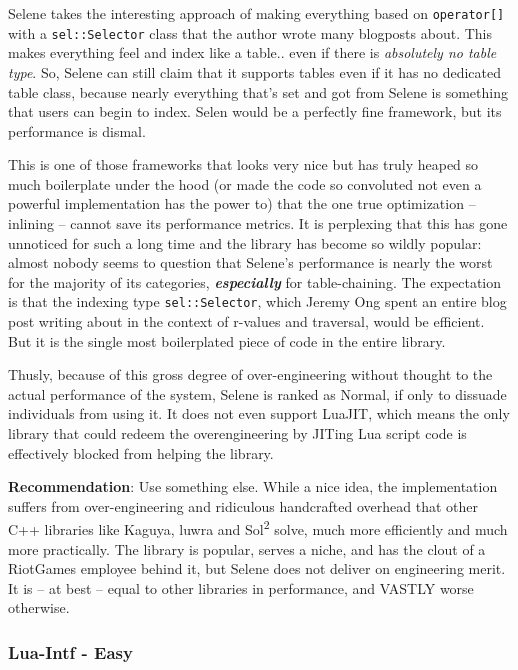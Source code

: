 \documentclass[conference,compsoc]{IEEEtran}
\newcommand{\soltwo}{Sol\textsuperscript{2}}
\begin{document}
Selene takes the interesting approach of making everything based on \lstinline|operator[]| with a \lstinline|sel::Selector| class that the author wrote many blogposts about. This makes everything feel and index like a table.. even if there is \emph{absolutely no table type}. So, Selene can still claim that it supports tables even if it has no dedicated table class, because nearly everything that's set and got from Selene is something that users can begin to index. Selen would be a perfectly fine framework, but its performance is dismal.

This is one of those frameworks that looks very nice but has truly heaped so much boilerplate under the hood (or made the code so convoluted not even a powerful implementation has the power to) that the one true optimization -- inlining -- cannot save its performance metrics. It is perplexing that this has gone unnoticed for such a long time and the library has become so wildly popular: almost nobody seems to question that Selene's performance is nearly the worst for the majority of its categories, \emph{\textbf{especially}} for table-chaining. The expectation is that the indexing type \lstinline|sel::Selector|, which Jeremy Ong spent an entire blog post writing about in the context of r-values and traversal, would be efficient. But it is the single most boilerplated piece of code in the entire library.

Thusly, because of this gross degree of over-engineering without thought to the actual performance of the system, Selene is ranked as Normal, if only to dissuade individuals from using it. It does not even support LuaJIT, which means the only library that could redeem the overengineering by JITing Lua script code is effectively blocked from helping the library.

\textbf{Recommendation}: Use something else. While a nice idea, the implementation suffers from over-engineering and ridiculous handcrafted overhead that other C++ libraries like Kaguya, luwra and \soltwo{} solve, much more efficiently and much more practically. The library is popular, serves a niche, and has the clout of a RiotGames employee behind it, but Selene does not deliver on engineering merit. It is -- at best -- equal to other libraries in performance, and VASTLY worse otherwise.

\subsubsection{Lua-Intf - Easy}\label{sssec:lua-intf}
\end{document}
